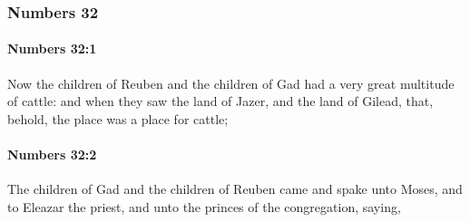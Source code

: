 	\subsubsection{Numbers 32} %
		\label{NUMBERS-32}

		\paragraph{Numbers 32:1} %
			\label{NUMBERS-32-1}

			Now the children of Reuben and the children of Gad had a very great multitude of cattle: and when they saw the land of Jazer, and the land of Gilead, that, behold, the place was a place for cattle;


		\paragraph{Numbers 32:2} %
			\label{NUMBERS-32-2}

			The children of Gad and the children of Reuben came and spake unto Moses, and to Eleazar the priest, and unto the princes of the congregation, saying,

